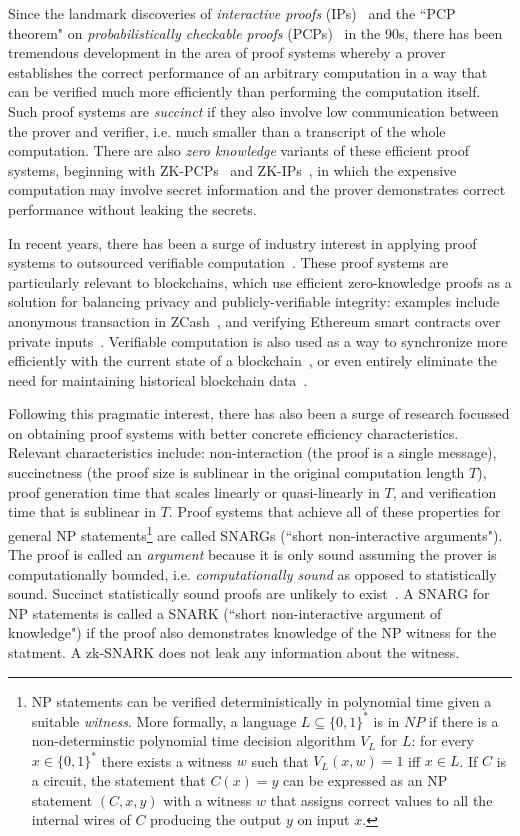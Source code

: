 
Since the landmark discoveries of \emph{interactive proofs} (IPs)~\cite{STOC:GolMicRac85} and the ``PCP theorem" on \emph{probabilistically checkable proofs} (PCPs)~\cite{STOC:BFLS91,FOCS:ALMSS92} in the 90s, there has been tremendous development in the area of proof systems whereby a prover establishes the correct performance of an arbitrary computation in a way that can be verified much more efficiently than performing the computation itself. Such proof systems are \emph{succinct} if they also involve low communication between the prover and verifier, i.e. much smaller than a transcript of the whole computation. There are also \emph{zero knowledge} variants of these efficient proof systems, beginning with ZK-PCPs~\cite{STOC:Kilian92} and ZK-IPs~\cite{C:BGGHKMR88}, in which the expensive computation may involve secret information and the prover demonstrates correct performance without leaking the secrets. 

In recent years, there has been a surge of industry interest in applying proof systems to outsourced verifiable computation~\cite{Sources}. These proof systems are particularly relevant to blockchains, which use efficient zero-knowledge proofs as a solution for balancing privacy and publicly-verifiable integrity: examples include anonymous transaction in ZCash~\cite{SP:BCGGMT14,Zcash}, and verifying Ethereum smart contracts over private inputs~\cite{ZKContracts}. Verifiable computation is also used as a way to synchronize more efficiently with the current state of a blockchain~\cite{Rollup}, or even entirely eliminate the need for maintaining historical blockchain data~\cite{Coda}. 

Following this pragmatic interest, there has also been a surge of research focussed on obtaining proof systems with better concrete efficiency characteristics. Relevant characteristics include: non-interaction (the proof is a single message), succinctness (the proof size is sublinear in the original computation length $T$), proof generation time that scales linearly or quasi-linearly in $T$, and verification time that is sublinear in $T$. Proof systems that achieve all of these properties for general NP statements\footnote{NP statements can be verified deterministically in polynomial time given a suitable \emph{witness}. More formally, a language $L \subseteq \{0,1\}^*$ is in $NP$ if there is a non-determinstic polynomial time decision algorithm $V_L$ for $L$: for every $x \in \{0,1\}^*$ there exists a witness $w$ such that $V_L(x, w) = 1$ iff $x \in L$. If $C$ is a circuit, the statement that $C(x) = y$ can be expressed as an NP statement $(C, x, y)$ with a witness $w$ that assigns correct values to all the internal wires of $C$ producing the output $y$ on input $x$.} are called SNARGs (``short non-interactive arguments"). 
The proof is called an \emph{argument} because it is only sound assuming the prover is computationally bounded, i.e. \emph{computationally sound} as opposed to statistically sound. Succinct statistically sound proofs are unlikely to exist~\cite{CC:GolVadWig02,ICALP:Wee05}. 
A SNARG for NP statements is called a SNARK (``short non-interactive argument of knowledge") if the proof also demonstrates knowledge of the NP witness for the statment. A zk-SNARK does not leak any information about the witness. 


